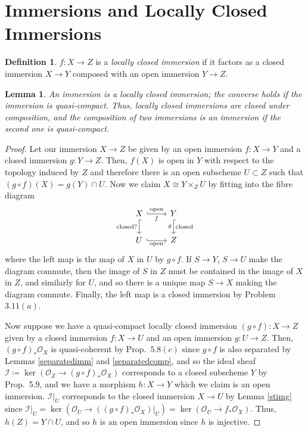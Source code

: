 \documentclass[12pt,letterpaper]{article}
\newtheorem{lemma}{Lemma}[section]
\theoremstyle{definition}
\newtheorem*{definition}{Definition}
\theoremstyle{remark}
\numberwithin{equation}{section}
\numberwithin{figure}{problem}
\newcommand{\II}{\mathscr{I}}
\newcommand{\OO}{\mathcal{O}}
\begin{document}
\section{Immersions and Locally Closed Immersions}
\begin{definition}
  $f\colon X \to Z$ is a \emph{locally closed immersion} if it factors as a closed immersion $X \to Y$ composed with an open immersion $Y \to Z$.
\end{definition}
\begin{lemma}\label{immislcimm}
  An immersion is a locally closed immersion; the converse holds if the immersion is quasi-compact. Thus, locally closed immersions are closed under composition, and the composition of two immersions is an immersion if the second one is quasi-compact.
\end{lemma}
\begin{proof}
  Let our immersion $X \to Z$ be given by an open immersion $f\colon X \to Y$ and a closed immersion $g\colon Y \to Z$. Then, $f(X)$ is open in $Y$ with respect to the topology induced by $Z$ and therefore there is an open subscheme $U \subset Z$ such that $(g \circ f)(X) = g(Y) \cap U$. Now we claim $X \cong Y \times_Z U$ by fitting into the fibre diagram
  \begin{equation*}
    \begin{tikzcd}
      X \dar[hook,swap]{\text{closed?}}\rar[hook]{\text{open}}[swap]{f} & Y\dar[hook]{\text{closed}}[swap]{g}\\
      U \rar[hook,swap]{\text{open}} & Z
    \end{tikzcd}
  \end{equation*}
  where the left map is the map of $X$ in $U$ by $g \circ f$. If $S \to Y$, $S \to U$ make the diagram commute, then the image of $S$ in $Z$ must be contained in the image of $X$ in $Z$, and similarly for $U$, and so there is a unique map $S \to X$ making the diagram commute. Finally, the left map is a closed immersion by Problem $3.11(a)$.
  \par Now suppose we have a quasi-compact locally closed immersion $(g \circ f)\colon X \to Z$ given by a closed immersion $f\colon X \to U$ and an open immersion $g \colon U \to Z$. Then, $(g \circ f)_*\OO_X$ is quasi-coherent by Prop.~$5.8(c)$ since $g \circ f$ is also separated by Lemmas \ref{separatedimm} and \ref{separatedcomp}, and so the ideal sheaf $\II \coloneqq \ker(\OO_Z\to(g \circ f)_*\OO_X)$ corresponds to a closed subscheme $Y$ by Prop.~5.9, and we have a morphism $h\colon X \to Y$ which we claim is an open immersion. $\II\vert_U$ corresponds to the closed immersion $X \to U$ by Lemma \ref{stimg} since $\II\vert_U = \ker(\OO_U \to ((g \circ f)_*\OO_X)\vert_U) = \ker(\OO_U \to f_*\OO_X)$. Thus, $h(Z) = Y \cap U$, and so $h$ is an open immersion since $h$ is injective.

\end{proof}
\end{document}
